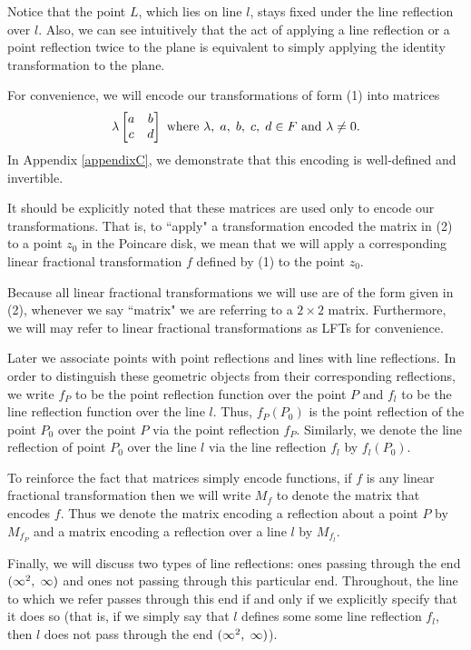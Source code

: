 \documentclass[12pt]{article}
\newcommand{\lftmat}[4]{\begin{bmatrix} {#1} & {#2} \\ {#3} & {#4} \end{bmatrix}}
\newcommand{\stanlftmat}{\lftmat{a}{b}{c}{d}}
\newcommand{\ttc}{, \hspace{1mm}}
\newcommand{\specialend}{(\infty^2\ttc\infty)}
\theoremstyle{plain}
\theoremstyle{definition}
\begin{document}
Notice that the point $L$, which lies on line $l$, stays fixed under the line reflection over $l$. Also, we can see intuitively that the act of applying a line reflection or a point reflection twice to the plane is equivalent to simply applying the identity transformation to the plane.

For convenience, we will encode our transformations of form (1) into matrices
\begin{equation}
	\lambda \stanlftmat \text{ where } \lambda \ttc a \ttc b \ttc c \ttc d \in F \text{ and } \lambda \neq 0. 
\end{equation}
In Appendix \ref{appendixC}, we demonstrate that this encoding is well-defined and invertible. 

It should be explicitly noted that these matrices are used only to encode our transformations. That is, to ``apply" a transformation encoded the matrix in (2) to a point $z_0$ in the Poincare disk, we mean that we will apply a corresponding linear fractional transformation $f$ defined by (1) to the point $z_0$. 

Because all linear fractional transformations we will use are of the form given in (2), whenever we say ``matrix" we are referring to a $2 \times 2$ matrix. Furthermore, we will may refer to linear fractional transformations as LFTs for convenience. 

Later we associate points with point reflections and lines with line reflections. In order to distinguish these geometric objects from their corresponding reflections, we write $f_P$ to be the point reflection function over the point $P$ and $f_l$ to be the line reflection function over the line $l$. Thus, $f_P(P_0)$ is the point reflection of the point $P_0$ over the point $P$ via the point reflection $f_P$. Similarly, we denote the line reflection of point $P_0$ over the line $l$ via the line reflection $f_l$ by $f_l(P_0)$.

To reinforce the fact that matrices simply encode functions, if $f$ is any linear fractional transformation then we will write $M_f$ to denote the matrix that encodes $f$. Thus we denote the matrix encoding a reflection about a point $P$ by $M_{f_P}$ and a matrix encoding a reflection over a line $l$ by $M_{f_l}$. 

Finally, we will discuss two types of line reflections: ones passing through the end $\specialend$ and ones not passing through this particular end. Throughout, the line to which we refer passes through this end if and only if we explicitly specify that it does so (that is, if we simply say that $l$ defines some some line reflection $f_l$, then $l$ does not pass through the end $\specialend$).
\end{document}
